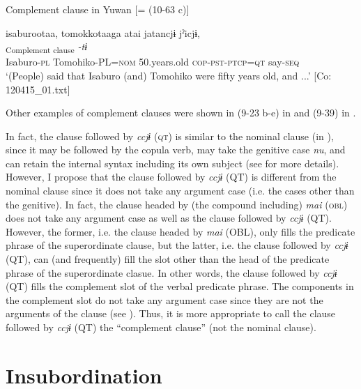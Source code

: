 \ea\label{ex:11-5}  Complement clause in Yuwan [= (10-63 c)]
  
      \glll    isaburootaa,  tomokkotaaga  atai  jatancjɨ   jˀicjɨ,\\
    [\textit{isaburoo-taa}  \textit{tomokko-taa=ga}  \textit{atai}  \textit{jar-tar-n=\Highlight{ccjɨ}}]\textsubscript{Complement clause}    \textit{-tɨ}\\
    Isaburo-\textsc{pl}  Tomohiko-PL=\textsc{nom}  50.years.old  \textsc{cop}-\textsc{pst}-\textsc{ptcp}=\textsc{qt}  say-\textsc{seq}\\
    \glt ‘(People) said that Isaburo (and) Tomohiko were fifty years old, and ...’    [Co: 120415\_01.txt]
\z

Other examples of complement clauses were shown in (9-23 b-e) in  and (9-39) in .

In fact, the clause followed by \textit{ccjɨ} (\textsc{qt}) is similar to the nominal clause (in ), since it may be followed by the copula verb, may take the genitive case \textit{nu}, and can retain the internal syntax including its own subject (see  for more details). However, I propose that the clause followed by \textit{ccjɨ} (QT) is different from the nominal clause since it does not take any argument case (i.e. the cases other than the genitive). In fact, the clause headed by (the compound including) \textit{mai} (\textsc{obl}) does not take any argument case as well as the clause followed by \textit{ccjɨ} (QT). However, the former, i.e. the clause headed by \textit{mai} (OBL), only fills the predicate phrase of the superordinate clause, but the latter, i.e. the clause followed by \textit{ccjɨ} (QT), can (and frequently) fill the slot other than the head of the predicate phrase of the superordinate clasue. In other words, the clause followed by \textit{ccjɨ} (QT) fills the complement slot of the verbal predicate phrase. The components in the complement slot do not take any argument case since they are not the arguments of the clause (see ). Thus, it is more appropriate to call the clause followed by \textit{ccjɨ} (QT) the “complement clause” (not the nominal clause).

\section{Insubordination}\label{sec:11.2}

